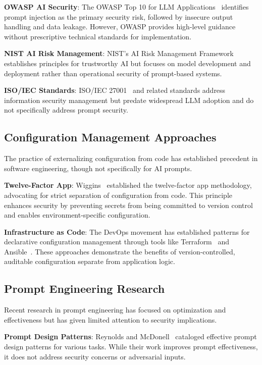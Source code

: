 \textbf{OWASP AI Security}: The OWASP Top 10 for LLM Applications~\cite{owasp2023llm} identifies prompt injection as the primary security risk, followed by insecure output handling and data leakage. However, OWASP provides high-level guidance without prescriptive technical standards for implementation.

\textbf{NIST AI Risk Management}: NIST's AI Risk Management Framework~\cite{nist2023ai} establishes principles for trustworthy AI but focuses on model development and deployment rather than operational security of prompt-based systems.

\textbf{ISO/IEC Standards}: ISO/IEC 27001~\cite{iso27001} and related standards address information security management but predate widespread LLM adoption and do not specifically address prompt security.

\subsection{Configuration Management Approaches}

The practice of externalizing configuration from code has established precedent in software engineering, though not specifically for AI prompts.

\textbf{Twelve-Factor App}: Wiggins~\cite{wiggins2011twelve} established the twelve-factor app methodology, advocating for strict separation of configuration from code. This principle enhances security by preventing secrets from being committed to version control and enables environment-specific configuration.

\textbf{Infrastructure as Code}: The DevOps movement has established patterns for declarative configuration management through tools like Terraform~\cite{terraform} and Ansible~\cite{ansible}. These approaches demonstrate the benefits of version-controlled, auditable configuration separate from application logic.

\subsection{Prompt Engineering Research}

Recent research in prompt engineering has focused on optimization and effectiveness but has given limited attention to security implications.

\textbf{Prompt Design Patterns}: Reynolds and McDonell~\cite{reynolds2021prompt} cataloged effective prompt design patterns for various tasks. While their work improves prompt effectiveness, it does not address security concerns or adversarial inputs.

